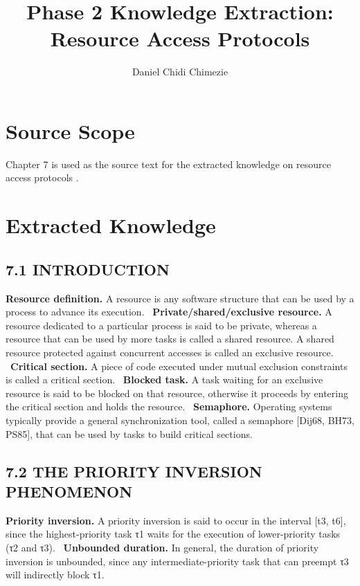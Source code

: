 \documentclass[conference]{IEEEtran}
\title{Phase 2 Knowledge Extraction: Resource Access Protocols}
\author{Daniel Chidi Chimezie}
\begin{document}
\maketitle
\section{Source Scope}
Chapter 7 is used as the source text for the extracted knowledge on resource access protocols \cite{Buttazzo2011}.
\section{Extracted Knowledge}
\subsection{7.1 INTRODUCTION}
\textbf{Resource definition.} A resource is any software structure that can be used by a process to advance its execution. \cite{Buttazzo2011}\
\textbf{Private/shared/exclusive resource.} A resource dedicated to a particular process is said to be private, whereas a resource that can be used by more tasks is called a shared resource. A shared resource protected against concurrent accesses is called an exclusive resource. \cite{Buttazzo2011}\
\textbf{Critical section.} A piece of code executed under mutual exclusion constraints is called a critical section. \cite{Buttazzo2011}\
\textbf{Blocked task.} A task waiting for an exclusive resource is said to be blocked on that resource, otherwise it proceeds by entering the critical section and holds the resource. \cite{Buttazzo2011}\
\textbf{Semaphore.} Operating systems typically provide a general synchronization tool, called a semaphore [Dij68, BH73, PS85], that can be used by tasks to build critical sections. \cite{Buttazzo2011}\
\subsection{7.2 THE PRIORITY INVERSION PHENOMENON}
\textbf{Priority inversion.} A priority inversion is said to occur in the interval [t3, t6], since the highest-priority task τ1 waits for the execution of lower-priority tasks (τ2 and τ3). \cite{Buttazzo2011}\
\textbf{Unbounded duration.} In general, the duration of priority inversion is unbounded, since any intermediate-priority task that can preempt τ3 will indirectly block τ1. \cite{Buttazzo2011}\
\end{document}
